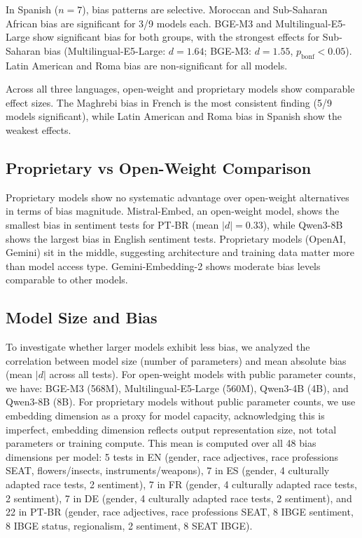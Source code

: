 \documentclass{sbc2019}
\begin{document}
In Spanish ($n = 7$), bias patterns are selective. Moroccan and Sub-Saharan African bias are significant for 3/9 models each. BGE-M3 and Multilingual-E5-Large show significant bias for both groups, with the strongest effects for Sub-Saharan bias (Multilingual-E5-Large: $d = 1.64$; BGE-M3: $d = 1.55$, $p_{\mathrm{bonf}} < 0.05$). Latin American and Roma bias are non-significant for all models.

Across all three languages, open-weight and proprietary models show comparable effect sizes. The Maghrebi bias in French is the most consistent finding (5/9 models significant), while Latin American and Roma bias in Spanish show the weakest effects.

\subsection{Proprietary vs Open-Weight Comparison}

Proprietary models show no systematic advantage over open-weight alternatives in terms of bias magnitude. Mistral-Embed, an open-weight model, shows the smallest bias in sentiment tests for PT-BR (mean $|d| = 0.33$), while Qwen3-8B shows the largest bias in English sentiment tests. Proprietary models (OpenAI, Gemini) sit in the middle, suggesting architecture and training data matter more than model access type. Gemini-Embedding-2 shows moderate bias levels comparable to other models.

\subsection{Model Size and Bias}

To investigate whether larger models exhibit less bias, we analyzed the correlation between model size (number of parameters) and mean absolute bias (mean $|d|$ across all tests). For open-weight models with public parameter counts, we have: BGE-M3 (568M), Multilingual-E5-Large (560M), Qwen3-4B (4B), and Qwen3-8B (8B). For proprietary models without public parameter counts, we use embedding dimension as a proxy for model capacity, acknowledging this is imperfect, embedding dimension reflects output representation size, not total parameters or training compute. This mean is computed over all 48 bias dimensions per model: 5 tests in EN (gender, race adjectives, race professions SEAT, flowers/insects, instruments/weapons), 7 in ES (gender, 4 culturally adapted race tests, 2 sentiment), 7 in FR (gender, 4 culturally adapted race tests, 2 sentiment), 7 in DE (gender, 4 culturally adapted race tests, 2 sentiment), and 22 in PT-BR (gender, race adjectives, race professions SEAT, 8 IBGE sentiment, 8 IBGE status, regionalism, 2 sentiment, 8 SEAT IBGE).
\end{document}
